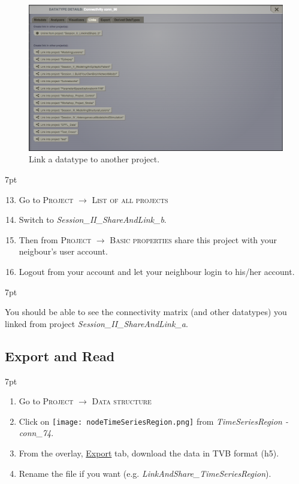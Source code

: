 \documentclass{tufte-handout}
\newenvironment{formal}{%
  \def\FrameCommand{%
    \hspace{1pt}%
    {\color{DarkBlue}\vrule width 2pt}%
    {\color{formalshade}\vrule width 4pt}%
    \colorbox{formalshade}%
  }%
  \MakeFramed{\advance\hsize-\width\FrameRestore}%
  \noindent\hspace{-4.55pt}%
  \begin{adjustwidth}{}{7pt}%
  \vspace{2pt}\vspace{2pt}%
}
{%
  \vspace{2pt}\end{adjustwidth}\endMakeFramed%
}
\newenvironment{blah}{%
  \def\FrameCommand{%
    \hspace{1pt}%
    {\color{DarkOrange}\vrule width 2pt}%
    {\color{PeachPuff}\vrule width 4pt}%
    \colorbox{PeachPuff}%
  }%
  \MakeFramed{\advance\hsize-\width\FrameRestore}%
  \noindent\hspace{-4.55pt}%
  \begin{adjustwidth}{}{7pt}%
  \vspace{2pt}\vspace{2pt}%
}
{%
  \vspace{2pt}\end{adjustwidth}\endMakeFramed%
}
\begin{document}
\begin{figure}[h]
  \includegraphics[width=\linewidth]{Handout_UI_LinkAndShare_LinkedProject}%
  \caption{Link a datatype to another project.}%
  \label{fig:linkproject}%
\end{figure}

\begin{formal}
  \begin{enumerate}[resume]
    \setcounter{enumi}{12}
    \item Go to \textsc{Project} $\rightarrow$ \textsc{List of all projects}
    \item Switch to \textit{Session\_II\_ShareAndLink\_b}.
    \item Then from \textsc{Project} $\rightarrow$ \textsc{Basic properties} 
share this project with your neigbour's user account. 
    \item Logout from your account and let your neighbour login to his/her account. 
  \end{enumerate}
\end{formal} 

\begin{blah}
You should be able to see the connectivity matrix (and other datatypes) you linked
from project \textit{Session\_II\_ShareAndLink\_a}.
\end{blah}

\subsection{Export and Read}\label{sec:link_and_share}

\begin{formal}
  \begin{enumerate}
    \item Go to \textsc{Project} $\rightarrow$ \textsc{Data structure}
    \item Click on \texttt{[image: nodeTimeSeriesRegion.png]} from \textit{TimeSeriesRegion - conn\_74}. 
    \item From the overlay, \underline{Export} tab, download the data in TVB format (h5).
    \item Rename the file if you want (e.g. \textit{LinkAndShare\_TimeSeriesRegion}).
  \end{enumerate}
\end{formal} 
\end{document}
